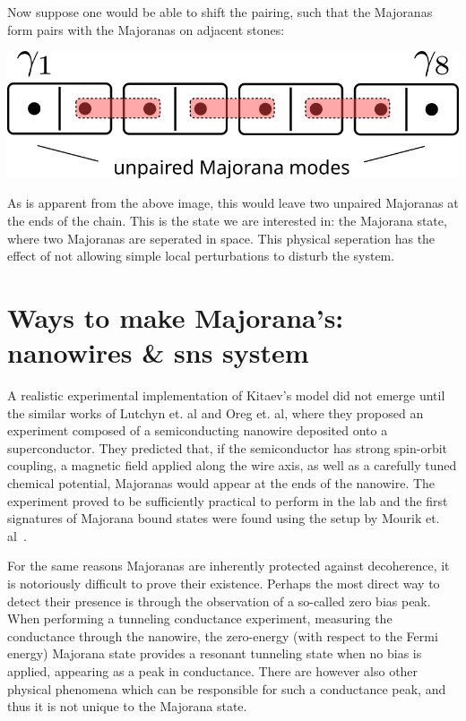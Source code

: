 	Now suppose one would be able to shift the pairing, such that the Majoranas form pairs with the Majoranas on adjacent stones:\\

	\begin{centering}
	\includegraphics[width=0.95\columnwidth]{images/topological_dominoes}
	\end{centering}
	
	As is apparent from the above image, this would leave two unpaired Majoranas at the ends of the chain.
	This is the state we are interested in: the Majorana state, where two Majoranas are seperated in space.
	This physical seperation has the effect of not allowing simple local perturbations to disturb the system.

\section{Ways to make Majorana's: nanowires \& sns system}
	A realistic experimental implementation of Kitaev's model did not emerge until the similar works of Lutchyn et. al\cite{lutchyn_majorana_2010} and Oreg et. al\cite{ oreg_helical_2010}, where they proposed an experiment composed of a semiconducting nanowire deposited onto a superconductor.
	They predicted that, if the semiconductor has strong spin-orbit coupling, a magnetic field applied along the wire axis, as well as a carefully tuned chemical potential, Majoranas would appear at the ends of the nanowire.
	The experiment proved to be sufficiently practical to perform in the lab and the first signatures of Majorana bound states were found using the setup by Mourik et. al~\cite{mourik_signatures_2012}.

	For the same reasons Majoranas are inherently protected against decoherence, it is notoriously difficult to prove their existence.
	Perhaps the most direct way to detect their presence is through the observation of a so-called zero bias peak.
	When performing a tunneling conductance experiment, measuring the conductance through the nanowire, the zero-energy (with respect to the Fermi energy) Majorana state provides a resonant tunneling state when no bias is applied, appearing as a peak in conductance.
	There are however also other physical phenomena which can be responsible for such a conductance peak, and thus it is not unique to the Majorana state.

